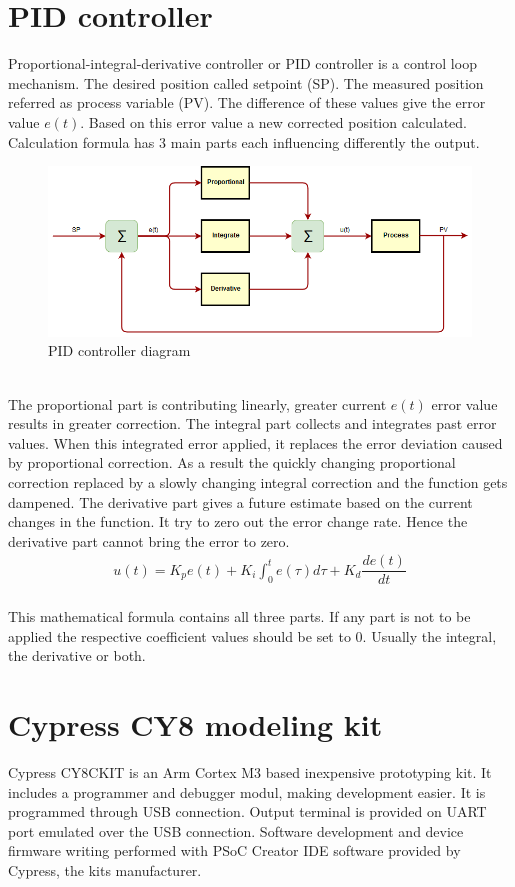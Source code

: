 \documentclass[11pt,a4paper,oneside,article]{memoir}
\begin{document}
\section{PID controller}
Proportional-integral-derivative controller or PID controller is a control loop mechanism. The desired position called setpoint (SP). The measured position referred as process variable (PV). The difference of these values give the error value $ e(t) $. Based on this error value a new corrected position calculated. Calculation formula has 3 main parts each influencing differently the output.\\
\begin{figure}[h]
	\centering
	\includegraphics[width=12cm]{illustration/PID_controller}
	\caption[]{PID controller diagram}
	\label{fig:pidcontroller}
\end{figure}\\
The proportional part is contributing linearly, greater current $ e(t) $ error value results in greater correction.
The integral part collects and integrates past error values. When this integrated error applied, it replaces the error deviation caused by proportional correction. As a result the quickly changing proportional correction replaced by a slowly changing integral correction and the function gets dampened.
The derivative part gives a future estimate based on the current changes in the function. It try to zero out the error change rate. Hence the derivative part cannot bring the error to zero.\\
\begin{align}
u(t) = K_{p}e(t) + K_{i} \int_{0}^{t} e(\tau)d\tau + K_{d} \dfrac{de(t)}{dt}
\end{align}\\
This mathematical formula contains all three parts. If any part is not to be applied the respective coefficient values should be set to 0. Usually the integral, the derivative or both.
\cite{wikipedia:PID}
\cite{Lectures}

\section{Cypress CY8 modeling kit}
Cypress CY8CKIT is an Arm Cortex M3 based inexpensive prototyping kit. It includes a programmer and debugger modul, making development easier. It is programmed through USB connection. Output terminal is provided on UART port emulated over the USB connection. Software development and device firmware writing performed with PSoC Creator IDE software provided by Cypress, the kits manufacturer.\cite{cy8ckit}
\end{document}
